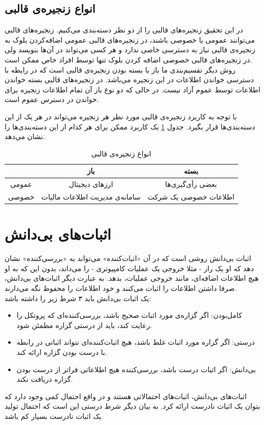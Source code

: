  \subsection{انواع زنجیره‌ی قالبی}
 در این تحقیق زنجیره‌های قالبی‌ را از دو نظر دسته‌‌بندی می‌کنیم. زنجیره‌های قالبی‌ می‌توانند عمومی یا خصوصی باشند، در زنجیره‌های قالبی‌ عمومی اضافه‌کردن بلوک به زنجیره‌ی قالبی نیاز به دسترسی خاصی ندارد و هر کسی می‌تواند در آن‌ها بنویسد ولی در زنجیره‌های قالبی خصوصی اضافه کردن بلوک تنها توسط افراد خاص ممکن است. 
 \\
 روش دیگر تقسیم‌بندی ما باز یا بسته بودن زنجیره‌ی قالبی است که در رایطه با دسترسی خواندن اطلاعات در این زنجیره می‌باشد. در زنجیره‌های قالبی‌ بسته خواندن اطلاعات توسط عموم آزاد نیست. در حالی که دو نوع باز آن تمام اطلاعات زنجیره برای خواندن در دسترس عموم است.
\par
با توجه به کاربرد زنجیره‌ی قالبی مورد نظر هر زنجیره‌ می‌تواند در هر یک از این دسته‌بندی‌ها قرار بگیرد. جدول  \ref{tab:tch} یک کاربرد ممکن برای هر کدام از این دسته‌بندی‌ها را نشان می‌دهد.

\begin{table}[h]
	\begin{center}
		\caption{انواع زنجیره‌ی قالبی}
		\begin{tabular}{|c|c|c|}
			\hline
			& باز & بسته \\
			\hline
			عمومی & ارز‌های دیجیتال & بعضی رأی‌گیری‌ها \\
			\hline
			خصوصی & سامانه‌ی مدیریت اطلاعات مالیات & اطلاعات خصوصی یک شرکت \\
			\hline

		\end{tabular}
		\label{tab:tch}
	\end{center}
\end{table}


 
 
\section{اثبات‌های بی‌دانش}
اثبات‌ بی‌دانش 
روشی است که در آن «اثبات‌کننده» می‌تواند یه «بررسی‌کننده» نشان دهد که او یک راز - مثلا خروجی یک عملیات کامپیوتری - را می‌داند، بدون این که به او هیچ اطلاعات اضافه‌ای، مانند خروجی عملیات، بدهد. به عبارت دیگر اثبات‌های بی‌دانش، صرفا داشتن اطلاعات را اثبات می‌کنند و خود اطلاعات را محفوظ نگه‌ می‌دارند.
\\
یک اثبات بی‌دانش باید ۳ شرط زیر را داشته باشد:
\begin{itemize}
	\item
	کامل‌بودن: اگر گزاره‌ی مورد اثبات صحیح باشد، بررسی‌کننده‌ای که پروتکل را رعایت کند، باید از درستی گزاره مطمئن شود.
	\item 
	درستی: اگر گزاره مورد اثبات غلط باشد، هیچ اثبات‌کننده‌ای نتواند اثباتی در رابطه با درست بودن گزاره ارائه کند.
	\item 
	بی‌دانش: اگر اثبات درست باشد، بررسی‌کننده هیچ اطلاعاتی فراتر از درست بودن گزاره دریافت نکند.
\end{itemize}
اثبات‌های بی‌دانش، اثبات‌های احتمالاتی هستند و در واقع احتمال کمی وجود دارد که بتوان یک اثبات نادرست ارائه کرد. به بیان دیگر شرط درستی این است که احتمال تولید یک اثبات نادرست بسیار کم باشد. 
